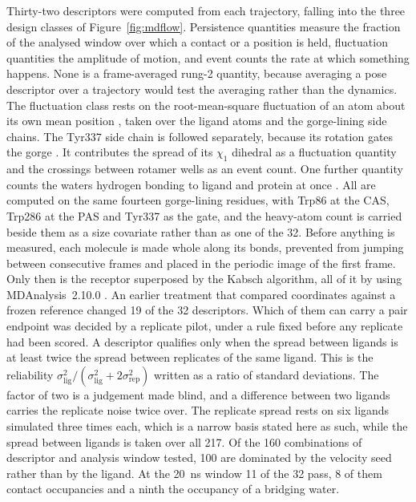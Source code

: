 Thirty-two descriptors were computed from each trajectory, falling into the three
design classes of Figure~\ref{fig:mdflow}. Persistence quantities measure the fraction
of the analysed window over which a contact or a position is held, fluctuation
quantities the amplitude of motion, and event counts the rate at which something
happens. None is a frame-averaged rung-2 quantity, because averaging a pose descriptor
over a trajectory would test the averaging rather than the dynamics. The fluctuation
class rests on the root-mean-square fluctuation of an atom about its own mean position
\citep{mdfluct,rmsf_bfactor}, taken over the ligand atoms and the gorge-lining side
chains. The Tyr337 side chain is followed separately, because its rotation gates the
gorge \citep{gating1998,gorge2017}. It contributes the spread of its $\chi_1$ dihedral
as a fluctuation quantity and the crossings between rotamer wells as an event count.
One further quantity counts the waters hydrogen bonding to ligand and protein at once
\citep{water_ladbury,water_levy}. All are computed on the same fourteen gorge-lining
residues, with Trp86 at the CAS, Trp286 at the PAS and Tyr337 as the gate, and the
heavy-atom count is carried beside them as a size covariate rather than as one of the
32. Before anything is measured, each molecule is made whole along its bonds, prevented
from jumping between consecutive frames and placed in the periodic image of the first
frame. Only then is the receptor superposed by the Kabsch algorithm, all of it by using
MDAnalysis~2.10.0 \citep{mdanalysis}. An earlier treatment that compared coordinates
against a frozen reference changed 19 of the 32 descriptors. Which of them can carry a
pair endpoint was decided by a replicate pilot, under a rule fixed before any replicate
had been scored. A descriptor qualifies only when the spread between ligands is at
least twice the spread between replicates of the same ligand. This is the reliability
$\sigma^2_{\mathrm{lig}}/(\sigma^2_{\mathrm{lig}} + 2\sigma^2_{\mathrm{rep}})$ written
as a ratio of standard deviations. The factor of two is a judgement made blind, and a
difference between two ligands carries the replicate noise twice over. The replicate
spread rests on six ligands simulated three times each, which is a narrow basis stated
here as such, while the spread between ligands is taken over all 217. Of the 160
combinations of descriptor and analysis window tested, 100 are dominated by the
velocity seed rather than by the ligand. At the \SI{20}{\nano\second} window 11 of the
32 pass, 8 of them contact occupancies and a ninth the occupancy of a bridging water.

